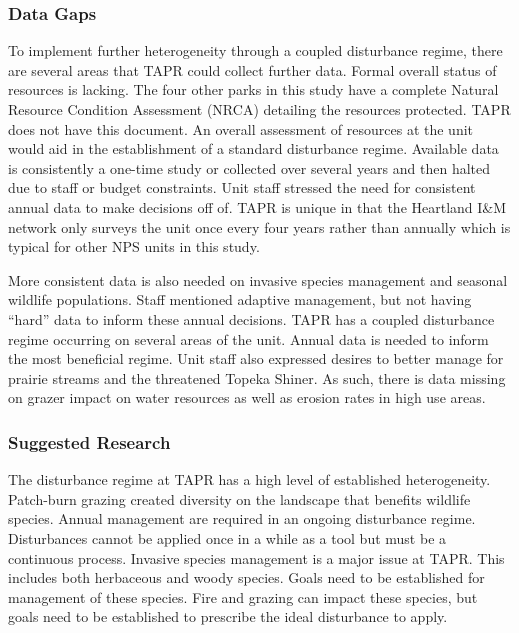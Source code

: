 \subsubsection{Data Gaps}

To implement further heterogeneity through a coupled disturbance regime, there are several areas that TAPR could collect further data. 
Formal overall status of resources is lacking. 
The four other parks in this study have a complete Natural Resource Condition Assessment (NRCA) detailing the resources protected. 
TAPR does not have this document. 
An overall assessment of resources at the unit would aid in the establishment of a standard disturbance regime. 
Available data is consistently a one-time study or collected over several years and then halted due to staff or budget constraints. 
Unit staff stressed the need for consistent annual data to make decisions off of. 
TAPR is unique in that the Heartland I\&M network only surveys the unit once every four
years rather than annually which is typical for other NPS units in this study.

More consistent data is also needed on invasive species management and seasonal wildlife populations. 
Staff mentioned adaptive management, but not having ``hard'' data to inform these annual decisions. 
TAPR has a coupled disturbance regime occurring on several areas of the unit.
Annual data is needed to inform the most beneficial regime. 
Unit staff also expressed desires to better manage for prairie streams and the threatened Topeka Shiner. 
As such, there is data missing on grazer impact on water resources as well as erosion rates in high use areas.

\subsubsection{Suggested Research}

The disturbance regime at TAPR has a high level of established heterogeneity. 
Patch-burn grazing created diversity on the landscape that benefits wildlife species. 
Annual management are required in an ongoing disturbance regime. 
Disturbances cannot be applied once in a while as a tool but must be a continuous process. 
Invasive species management is a major issue at TAPR. 
This includes both herbaceous and woody species. 
Goals need to be established for management of these species. 
Fire and grazing can impact these species, but goals need to be established to prescribe the ideal disturbance to apply.

